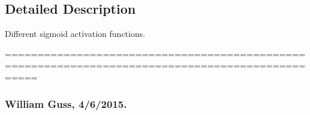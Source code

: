 \subsection{Detailed Description}
Different sigmoid activation functions. 

=================================================================================================

\subsubsection*{William Guss, 4/6/2015.  }